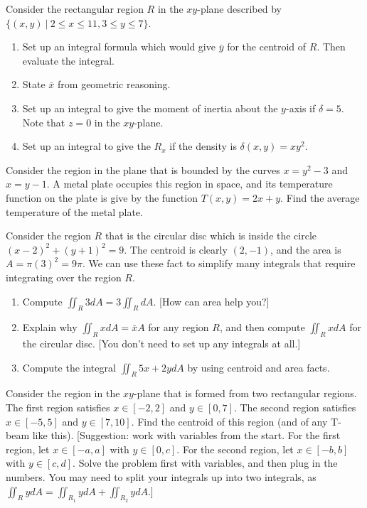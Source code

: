 \begin{problem}
Consider the rectangular region $R$ in the $xy$-plane described by $\{(x,y)\ |\ 2\leq x\leq 11, 3\leq y\leq 7\}$.
\begin{enumerate}
 \item Set up an integral formula which would give $\bar y$ for the centroid of $R$.  Then evaluate the integral.
 \item State $\bar x$ from geometric reasoning.
 \item Set up an integral to give the moment of inertia about the $y$-axis if $\delta=5$. Note that $z=0$ in the $xy$-plane.
 \item Set up an integral to give the $R_x$ if the density is $\delta(x,y)=xy^2$.
\end{enumerate}
\end{problem}

\begin{problem}
 Consider the region in the plane that is bounded by the curves $x=y^2-3$ and $x=y-1$.  A metal plate occupies this region in space, and its temperature function on the plate is give by the function $T(x,y)=2x+y$.  Find the average temperature of the metal plate.
\end{problem}

\begin{problem}\label{centroid trick}
Consider the region $R$ that is the circular disc which is inside the circle $(x-2)^2+(y+1)^2=9$. The centroid is clearly $(2,-1)$, and the area is $A=\pi(3)^2=9\pi$.  We can use these fact to simplify many integrals that require integrating over the region $R$.  
\begin{enumerate}
 \item Compute $\iint_R 3dA = 3\iint_RdA$.  [How can area help you?]
 \item Explain why $\iint_R x dA = \bar x A$ for any region $R$, and then compute $\iint_R x dA$ for the circular disc. [You don't need to set up any integrals at all.]
 \item Compute the integral $\iint_R 5x+2y dA$ by using centroid and area facts.
\end{enumerate}
\end{problem}

\begin{problem}
Consider the region in the $xy$-plane that is formed from two rectangular regions.  The first region satisfies $x\in[-2,2]$ and $y\in[0,7]$.  The second region satisfies $x\in[-5,5]$ and $y\in[7,10]$.  Find the centroid of this region (and of any T-beam like this).
[Suggestion: work with variables from the start. For the first region, let $x\in[-a,a]$ with $y\in[0,c]$.  For the second region, let $x\in[-b,b]$ with $y\in[c,d]$. Solve the problem first with variables, and then plug in the numbers. You may need to split your integrals up into two integrals, as $\iint_R ydA = \iint_{R_1}ydA +\iint_{R_2}ydA$.]
\end{problem}


